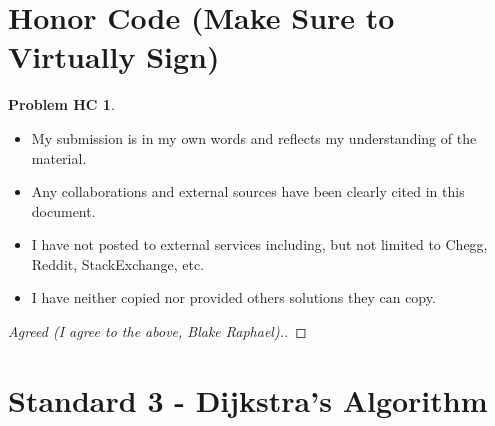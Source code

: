 \documentclass[11pt]{article}
\theoremstyle{definition}
\theoremstyle{definition}
\newtheorem*{requiredHC}{Problem HC}
\theoremstyle{definition}
\begin{document}
\newpage
\section*{Honor Code (Make Sure to Virtually Sign)} \label{HonorCode}
\hypertarget{HonorCode}{}

\begin{requiredHC}
\begin{itemize}
\item My submission is in my own words and reflects my understanding of the material.
\item Any collaborations and external sources have been clearly cited in this document.
\item I have not posted to external services including, but not limited to Chegg, Reddit, StackExchange, etc.
\item I have neither copied nor provided others solutions they can copy.
\end{itemize}

\end{requiredHC}

\begin{proof}[Agreed (I agree to the above, Blake Raphael).]
\end{proof}



\newpage
\setcounter{section}{2}
\section{Standard 3 - Dijkstra's Algorithm}
\end{document}
